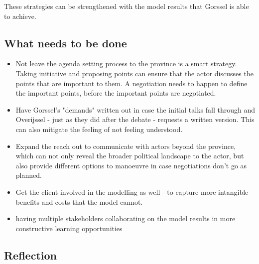 These strategies can be strengthened with the model results that Gorssel is able to achieve. 
\subsection{What needs to be done}

\begin{itemize}
    \item Not leave the agenda setting process to the province is a smart strategy. Taking initiative and proposing points can ensure that the actor discusses the points that are important to them. A negotiation needs to happen to define the important points, before the important points are negotiated.
    \item Have Gorssel's "demands" written out in case the initial talks fall through and Overijssel - just as they did after the debate - requests a written version. This can also mitigate the feeling of not feeling understood.  
    \item Expand the reach out to communicate with actors beyond the province, which can not only reveal the broader political landscape to the actor, but also provide different options to manoeuvre in case negotiations don't go as planned.
    \item Get the client involved in the modelling as well - to capture more intangible benefits and costs that the model cannot.
    \item having multiple stakeholders collaborating on the model results in more constructive learning opportunities
\end{itemize}

\subsection{Reflection}

